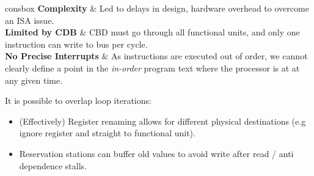 \begin{tabbox}[.6\textwidth]{consbox}
	\textbf{Complexity} & Led to delays in design, hardware overhead to overcome an ISA issue. \\
	\textbf{Limited by CDB} & CBD must go through all functional units, and only one instruction can write to bus per cycle. \\
	\textbf{No Precise Interrupts} & As instructions are executed out of order, we cannot clearly define a point in the \textit{in-order} program text where the processor is at at any given time. \\
\end{tabbox}

It is possible to overlap loop iterations:
\begin{itemize}
	\item (Effectively) Register renaming allows for different physical destinations (e.g ignore register and straight to functional unit).
	\item Reservation stations can buffer old values to avoid write after read / anti dependence stalls.
\end{itemize}


